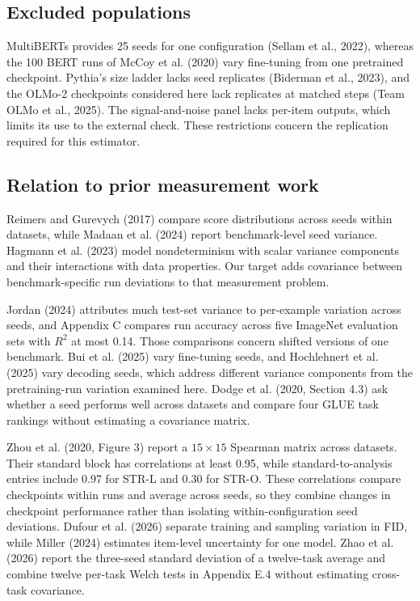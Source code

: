 \subsection{Excluded populations}
MultiBERTs provides 25 seeds for one configuration (Sellam et al., 2022), whereas the 100 BERT runs of McCoy et al. (2020) vary fine-tuning from one pretrained checkpoint. Pythia's size ladder lacks seed replicates (Biderman et al., 2023), and the OLMo-2 checkpoints considered here lack replicates at matched steps (Team OLMo et al., 2025). The signal-and-noise panel lacks per-item outputs, which limits its use to the external check. These restrictions concern the replication required for this estimator.

\subsection{Relation to prior measurement work}
Reimers and Gurevych (2017) compare score distributions across seeds within datasets, while Madaan et al. (2024) report benchmark-level seed variance. Hagmann et al. (2023) model nondeterminism with scalar variance components and their interactions with data properties. Our target adds covariance between benchmark-specific run deviations to that measurement problem.

Jordan (2024) attributes much test-set variance to per-example variation across seeds, and Appendix C compares run accuracy across five ImageNet evaluation sets with $R^2$ at most 0.14. Those comparisons concern shifted versions of one benchmark. Bui et al. (2025) vary fine-tuning seeds, and Hochlehnert et al. (2025) vary decoding seeds, which address different variance components from the pretraining-run variation examined here. Dodge et al. (2020, Section 4.3) ask whether a seed performs well across datasets and compare four GLUE task rankings without estimating a covariance matrix.

Zhou et al. (2020, Figure 3) report a $15\times15$ Spearman matrix across datasets. Their standard block has correlations at least 0.95, while standard-to-analysis entries include 0.97 for STR-L and 0.30 for STR-O. These correlations compare checkpoints within runs and average across seeds, so they combine changes in checkpoint performance rather than isolating within-configuration seed deviations. Dufour et al. (2026) separate training and sampling variation in FID, while Miller (2024) estimates item-level uncertainty for one model. Zhao et al. (2026) report the three-seed standard deviation of a twelve-task average and combine twelve per-task Welch tests in Appendix E.4 without estimating cross-task covariance.

